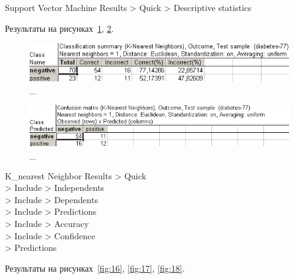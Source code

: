 Support Vector Machine Results > Quick > Descriptive statistics

Результаты на рисунках~\ref{fig:15_1}, \ref{fig:15_2}.

\begin{figure}[!h]
  \centering

  \includegraphics[width=16cm]
  {inc/v5_18_2.PNG}

  \caption{\_}

  \label{fig:15_1}
\end{figure}

\begin{figure}[!h]
  \centering

  \includegraphics[width=16cm]
  {inc/v5_18.PNG}

  \caption{\_}

  \label{fig:15_2}
\end{figure}

\newpage

K\_nearest Neighbor Results > Quick \\
> Include > Independents \\
> Include > Dependents \\
> Include > Predictions \\
> Include > Accuracy \\
> Include > Confidence \\
> Predictions

Результаты на рисунках~\ref{fig:16}, \ref{fig:17}, \ref{fig:18}.

